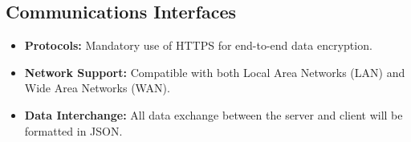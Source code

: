\subsection{Communications Interfaces}

\begin{itemize}
	\item \textbf{Protocols:} Mandatory use of HTTPS for end-to-end data encryption.
	\item \textbf{Network Support:} Compatible with both Local Area Networks (LAN) and Wide Area Networks (WAN).
	\item \textbf{Data Interchange:} All data exchange between the server and client will be formatted in JSON.
\end{itemize}